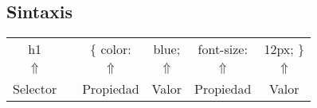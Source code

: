 \documentclass[a4paper,12pt]{article}
\begin{document}
\subsection*{Sintaxis}

\begin{center}
\begin{tabular}{c c c c c c}
    h1         & & $\{$ color: & blue;      & font-size: & 12px; $\}$ \\
    $\Uparrow$ & & $\Uparrow$  & $\Uparrow$ & $\Uparrow$ & $\Uparrow$\\
    Selector   & & Propiedad   & Valor      & Propiedad  & Valor \\
\end{tabular}
\end{center}
\end{document}
